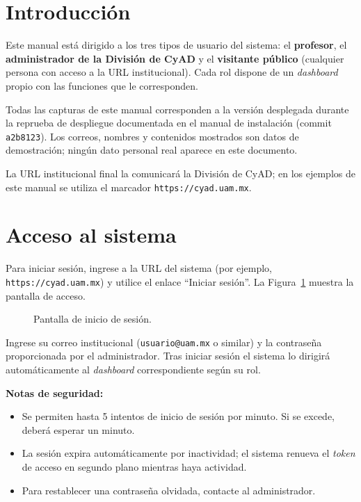 \documentclass{computacion}
\begin{document}
\portada
\setcounter{page}{1}
\pagestyle{fancy}

\tableofcontents
\listoffigures
\newpage

\section{Introducción}
Este manual está dirigido a los tres tipos de usuario del sistema: el \textbf{profesor}, el \textbf{administrador de la División de CyAD} y el \textbf{visitante público} (cualquier persona con acceso a la URL institucional). Cada rol dispone de un \emph{dashboard} propio con las funciones que le corresponden.

Todas las capturas de este manual corresponden a la versión desplegada durante la reprueba de despliegue documentada en el manual de instalación (commit \texttt{a2b8123}). Los correos, nombres y contenidos mostrados son datos de demostración; ningún dato personal real aparece en este documento.

La URL institucional final la comunicará la División de CyAD; en los ejemplos de este manual se utiliza el marcador \texttt{https://cyad.uam.mx}.

\section{Acceso al sistema}

Para iniciar sesión, ingrese a la URL del sistema (por ejemplo, \texttt{https://cyad.uam.mx}) y utilice el enlace ``Iniciar sesión''. La Figura~\ref{fig:m-login} muestra la pantalla de acceso.

\begin{figure}[!ht]
    \centering
    \caption{Pantalla de inicio de sesión.}
    \label{fig:m-login}
\end{figure}

Ingrese su correo institucional (\texttt{usuario@uam.mx} o similar) y la contraseña proporcionada por el administrador. Tras iniciar sesión el sistema lo dirigirá automáticamente al \emph{dashboard} correspondiente según su rol.

\textbf{Notas de seguridad:}
\begin{itemize}
    \item Se permiten hasta 5 intentos de inicio de sesión por minuto. Si se excede, deberá esperar un minuto.
    \item La sesión expira automáticamente por inactividad; el sistema renueva el \emph{token} de acceso en segundo plano mientras haya actividad.
    \item Para restablecer una contraseña olvidada, contacte al administrador.
\end{itemize}
\end{document}
